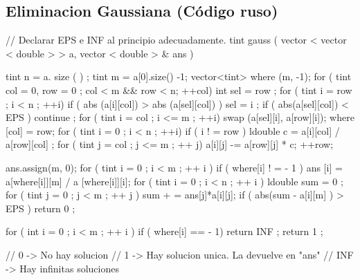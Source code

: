 \subsection{Eliminacion Gaussiana (Código ruso)}
\begin{code}
// Declarar EPS e INF al principio adecuadamente.
tint gauss ( vector < vector < double > > a, vector < double > & ans ) {
	tint n = a. size ( ) ;
	tint m = a[0].size() -1;
	vector<tint> where (m, -1);
	for ( tint col = 0, row = 0 ; col < m && row < n; ++col)
	{
		int sel = row ;
		for ( tint i = row ; i < n ; ++i)
			if ( abs (a[i][col]) > abs (a[sel][col]) )
				sel = i ;
		if ( abs(a[sel][col]) < EPS )
			continue ;
		for ( tint i = col ; i <= m ; ++i)
			swap (a[sel][i], a[row][i]);
		where [col] = row;
		for ( tint i = 0 ; i < n ; ++i)
			if ( i ! = row ) 
			{
				ldouble c = a[i][col] / a[row][col] ;
				for ( tint j = col ; j <= m ; ++ j)
					a[i][j] -= a[row][j] * c;
			}
		++row;
	}
 
	ans.assign(m, 0);
	for ( tint i = 0 ; i < m ; ++ i )
		if ( where[i] ! = - 1 )
			ans [i] = a[where[i]][m] / a [where[i]][i];
	for ( tint i = 0 ; i < n ; ++ i ) 
	{
		ldouble sum = 0 ;
		for ( tint j = 0 ; j < m ; ++ j )
			sum + = ans[j]*a[i][j];
		if ( abs(sum - a[i][m] ) > EPS )
			return 0 ;
	}
 
	for ( int i = 0 ; i < m ; ++ i )
		if ( where[i] == - 1)
			return INF ;
	return 1 ;
}

// 0 -> No hay solucion
// 1 -> Hay solucion unica. La devuelve en "ans"
// INF -> Hay infinitas soluciones

\end{code}


